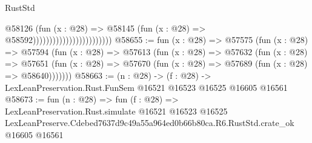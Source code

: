 \begin{lexlean}{RustStd}
\begin{coremodule}
                                              @58126
                                                (fun (x : @28) =>
                                                @58145
                                                  (fun (x : @28) => @58592))))))))))))))))))))))))
@58655 := fun (x : @28) =>
  @57575
    (fun (x : @28) =>
    @57594
      (fun (x : @28) =>
      @57613
        (fun (x : @28) =>
        @57632
          (fun (x : @28) =>
          @57651 (fun (x : @28) => @57670 (fun (x : @28) => @57689 (fun (x : @28) => @58640)))))))
@58663 := (n : @28) ->
  (f : @28) -> LexLeanPreservation.Rust.FunSem @16521 @16523 @16525 @16605 @16561
@58673 := fun (n : @28) =>
  fun (f : @28) =>
  LexLeanPreservation.Rust.simulate
    @16521
    @16523
    @16525
    LexLeanPreserve.Cdebed7637d9c49a55a964ed0b66b80ca.R6.RustStd.crate_ok
    @16605
    @16561
\end{coremodule}
\end{lexlean}
